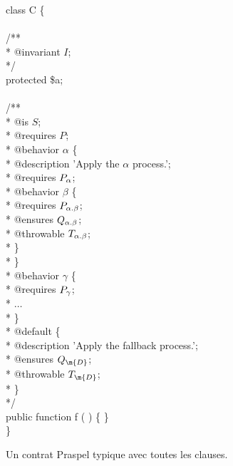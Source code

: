 \begin{figure}
\begin{bigpre}
class C \{ \\
\\
    /** \\
     * @invariant \(I\); \\
     */ \\
    protected \$a; \\
\\
    /** \\
     * @is \(S\); \\
     * @requires \(P\); \\
     * @behavior \(\alpha\) \{ \\
     *     @description 'Apply the \(\alpha\) process.'; \\
     *     @requires \(P\sb{\alpha}\); \\
     *     @behavior \(\beta\) \{ \\
     *         @requires  \(P\sb{\alpha.\beta}\); \\
     *         @ensures   \(Q\sb{\alpha.\beta}\); \\
     *         @throwable \(T\sb{\alpha.\beta}\); \\
     *     \} \\
     * \} \\
     * @behavior \(\gamma\) \{ \\
     *     @requires \(P\sb{\gamma}\); \\
     *     \(\dots\) \\
     * \} \\
     * @default \{ \\
     *     @description 'Apply the fallback process.'; \\
     *     @ensures   \(Q\sb{\m{D}}\); \\
     *     @throwable \(T\sb{\m{D}}\); \\
     * \} \\
     */ \\
    public function f ( ) \{ \} \\
\}
\end{bigpre}

\caption{\label{figure:language:typical_contract} Un contrat Praspel typique
avec toutes les clauses.}

\end{figure}

